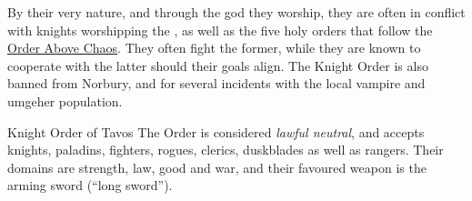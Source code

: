 By their very nature, and through the god they worship, they are often in
conflict with knights worshipping the , as well as
the five holy orders that follow the \hyperref[sec:Order]{Order Above Chaos}.
They often fight the former, while they are known to cooperate with the latter
should their goals align. The Knight Order is also banned from Norbury, and
 for several incidents with the local vampire and
umgeher population.

\begin{35e}{Knight Order of Tavos}
  The Order is considered \emph{lawful neutral}, and accepts knights, paladins,
  fighters, rogues, clerics, duskblades as well as rangers. Their domains
  are strength, law, good and war, and their favoured weapon is the arming
  sword (``long sword'').
\end{35e}

